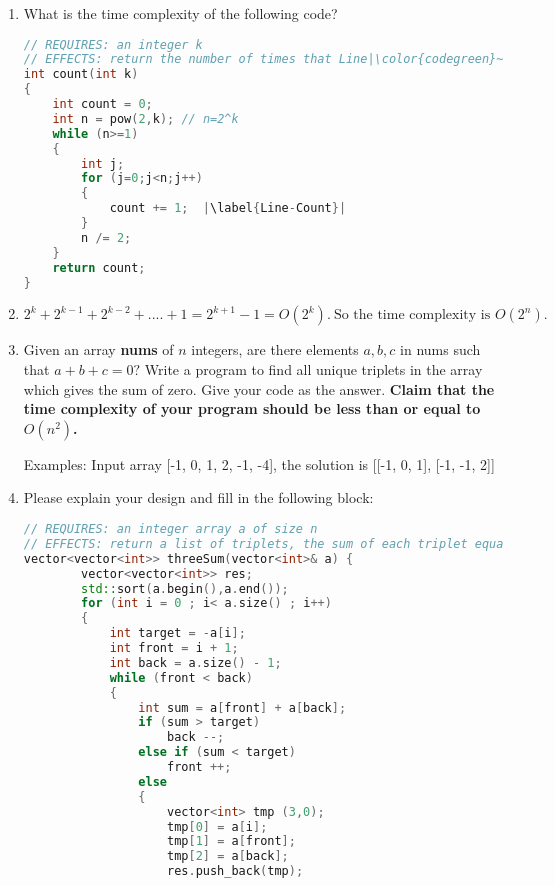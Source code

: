 \documentclass[12pt,a4paper]{article}
\makeatletter
\newtheorem*{solution}{Solution}
\theoremstyle{definition}
\renewenvironment{solution}[1][Solution] {\par\pushQED{\qed}\normalfont\topsep6\p@\@plus6\p@\relax\trivlist\item[\hskip\labelsep\bfseries#1\@addpunct{.}]\ignorespaces}{\popQED\endtrivlist\@endpefalse} \makeatother
\makeatother
\begin{document}
\begin{enumerate}

\item What is the time complexity of the following code?


\begin{lstlisting}[language=C++]
// REQUIRES: an integer k
// EFFECTS: return the number of times that Line|\color{codegreen}~\ref{Line-Count}| is executed
int count(int k)
{
	int count = 0;
	int n = pow(2,k); // n=2^k
	while (n>=1)
	{
		int j;
   		for (j=0;j<n;j++)
   		{
   			count += 1;  |\label{Line-Count}|	
   		}
   		n /= 2;
	}
	return count;
}
\end{lstlisting}



\begin{solution}
$$
	2^k+2^{k-1}+2^{k-2}+....+1 = 2^{k+1}-1=O(2^k). \ 
	\text{So the time complexity is } O(2^n).
$$
\end{solution}


\item Given an array \textbf{nums} of $n$ integers, are there elements $a, b, c$ in nums such that $a + b + c = 0?$ Write a program to find all unique triplets in the array which gives the sum of zero. Give your code as the answer. \textbf{Claim that the time complexity of your program should be less than or equal to $O(n^2)$.}

{\color{purple}Examples: Input array [-1, 0, 1, 2, -1, -4], the solution is [[-1, 0, 1], [-1, -1, 2]]}



\begin{solution}
Please explain your design and fill in the following block:

	\begin{lstlisting}[language=C++]
// REQUIRES: an integer array a of size n
// EFFECTS: return a list of triplets, the sum of each triplet equals to 0.
vector<vector<int>> threeSum(vector<int>& a) {
        vector<vector<int>> res;
        std::sort(a.begin(),a.end());
        for (int i = 0 ; i< a.size() ; i++)
        {
            int target = -a[i];
            int front = i + 1;
            int back = a.size() - 1;
            while (front < back)
            {
                int sum = a[front] + a[back];
                if (sum > target)
                    back --;
                else if (sum < target)
                    front ++;
                else
                {
                    vector<int> tmp (3,0);
                    tmp[0] = a[i];
                    tmp[1] = a[front];
                    tmp[2] = a[back];
                    res.push_back(tmp);
                        

\end{lstlisting}
\end{solution}
\end{enumerate}
\end{document}
